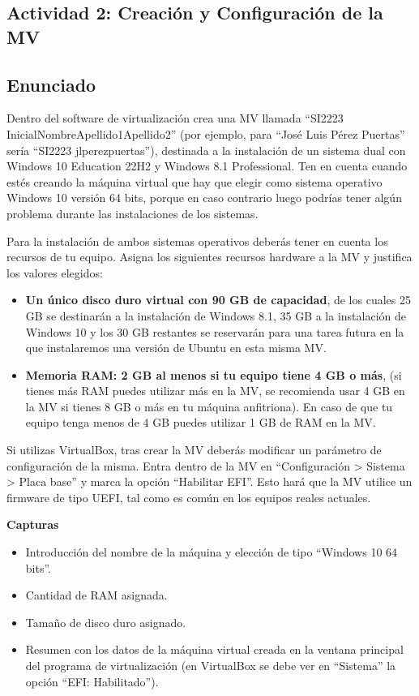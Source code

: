 \subsection{Actividad 2: Creación y Configuración de la MV}

\subsection{Enunciado}
Dentro del software de virtualización crea una MV llamada ``SI2223 InicialNombreApellido1Apellido2'' (por ejemplo, para ``José Luis Pérez Puertas'' sería ``SI2223 jlperezpuertas''), destinada a la instalación de un sistema dual con Windows 10 Education 22H2 y Windows 8.1 Professional. Ten en cuenta cuando estés creando la máquina virtual que hay que elegir como sistema operativo Windows 10 versión 64 bits, porque en caso contrario luego podrías tener algún problema durante las instalaciones de los sistemas.

Para la instalación de ambos sistemas operativos deberás tener en cuenta los recursos de tu equipo. Asigna los siguientes recursos hardware a la MV y justifica los valores elegidos:

\begin{itemize}
    \item \textbf{Un único disco duro virtual con 90 GB de capacidad}, de los cuales 25 GB se destinarán a la instalación de Windows 8.1, 35 GB a la instalación de Windows 10 y los 30 GB restantes se reservarán para una tarea futura en la que instalaremos una versión de Ubuntu en esta misma MV.

    \item \textbf{Memoria RAM: 2 GB al menos si tu equipo tiene 4 GB o más}, (si tienes más RAM puedes utilizar más en la MV, se recomienda usar 4 GB en la MV si tienes 8 GB o más en tu máquina anfitriona). En caso de que tu equipo tenga menos de 4 GB puedes utilizar 1 GB de RAM en la MV.
\end{itemize}


Si utilizas VirtualBox, tras crear la MV deberás modificar un parámetro de configuración de la misma. Entra dentro de la MV en ``Configuración > Sistema > Placa base'' y marca la opción ``Habilitar EFI''. Esto hará que la MV utilice un firmware de tipo UEFI, tal como es común en los equipos reales actuales.

\textbf{Capturas}

\begin{itemize}
    \item Introducción del nombre de la máquina y elección de tipo ``Windows 10 64 bits''.
    \item Cantidad de RAM asignada.
    \item Tamaño de disco duro asignado.
    \item Resumen con los datos de la máquina virtual creada en la ventana principal del programa de virtualización (en VirtualBox se debe ver en ``Sistema'' la opción ``EFI: Habilitado'').
\end{itemize}

